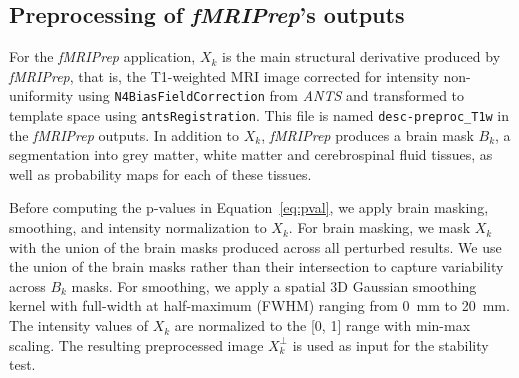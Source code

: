 \documentclass[lettersize,journal]{IEEEtran}
\newcommand{\fmriprep}{\emph{fMRIPrep}\xspace}
\newcommand{\fwhm}{\textsc{FWHM}}
\begin{document}
\subsection{Preprocessing of \fmriprep's outputs}

For the \fmriprep application, $X_k$ is the main structural derivative produced by \fmriprep, that is, the T1-weighted MRI image corrected for intensity non-uniformity using \texttt{N4BiasFieldCorrection} from \emph{ANTS} and transformed to template space using \texttt{antsRegistration}. This file is named \texttt{desc-preproc\_T1w} in the \fmriprep outputs. In addition to $X_k$, \fmriprep produces a brain mask $B_k$, a segmentation into grey matter, white matter and cerebrospinal fluid tissues, as well as probability maps for each of these tissues.

Before computing the p-values in Equation~\ref{eq:pval}, we apply brain masking, smoothing, and intensity normalization to $X_k$. For brain masking, we mask $X_k$ with the union of the brain masks produced across all perturbed results. We use the union of the brain masks rather than their intersection to capture variability across $B_k$ masks.
For smoothing, we apply a spatial 3D Gaussian smoothing kernel with full-width at half-maximum (\fwhm) ranging from 0~mm to 20~mm.
The intensity values of $X_k$ are normalized to the [0, 1] range with min-max scaling.
The resulting preprocessed image $X_k^\perp$ is used as input for the stability test.
\end{document}
